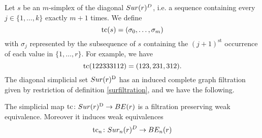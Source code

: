 %


Let $s$ be an $m$-simplex of the diagonal $Sur(r)^D$, i.e. a sequence containing every $j \in \{1,\dots,k\}$ exactly $m+1$ times.
We define
\[
\operatorname{tc}(s) = (\sigma_0,\dots,\sigma_m)
\]
with $\sigma_j$ represented by the subsequence of $s$ containing the $(j+1)^{\mathrm{st}}$ occurrence of each value in $\{1,\dots,r\}$.
For example, we have
\[
\operatorname{tc}(122333112) = (123,231,312).
\]
The diagonal simplicial set $Sur(r)^{\mathrm{D}}$ has an induced complete graph filtration given by restriction of definition \ref{surfiltration}, and we have the following.

\begin{theorem}
	The simplicial map $\operatorname{tc} \colon Sur(r)^{\mathrm{D}} \to BE(r)$ is a filtration preserving weak equivalence. Moreover it induces weak equivalences $$\operatorname{tc}_{n} \colon Sur_{n}(r)^{D}\rightarrow BE_{n}(r)$$
\end{theorem}


